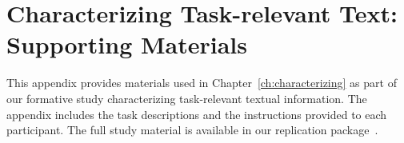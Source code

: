 \chapter{Characterizing Task-relevant Text: Supporting Materials}

This appendix provides materials used in
Chapter~\ref{ch:characterizing}
as part of our formative study characterizing task-relevant textual information.
The appendix includes the task descriptions and the instructions  provided 
to each participant. The full study material is available in our replication package~\cite{}.








